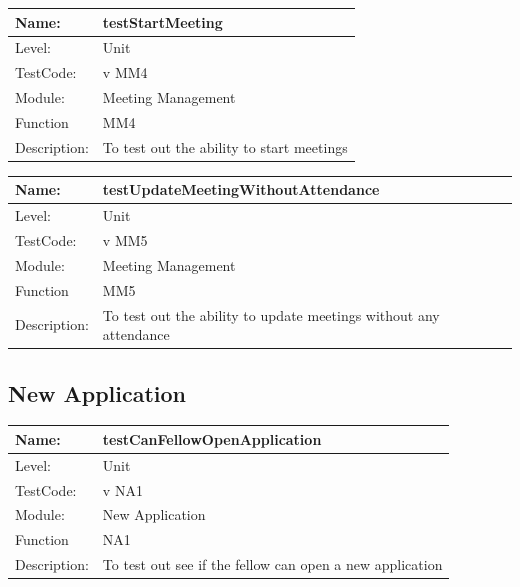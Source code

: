 \documentclass[12pt]{article}
\begin{document}
\begin{center}
\begin{tabular}{|l|p{12cm}|}
\hline

 Name: & testStartMeeting  \\
\hline
Level: & Unit \\
\hline
TestCode: & v MM4 \\
\hline
Module:& Meeting Management \\
\hline
Function & MM4 \\
\hline
Description: & To test out the ability to start meetings  \\
\hline

\end{tabular}
\end{center}

\begin{center}
\begin{tabular}{|l|p{12cm}|}
\hline

 Name: & testUpdateMeetingWithoutAttendance  \\
\hline
Level: & Unit \\
\hline
TestCode: & v MM5 \\
\hline
Module:& Meeting Management \\
\hline
Function & MM5 \\
\hline
Description: & To test out the ability to update meetings without any attendance  \\
\hline
\end{tabular}
\end{center}

\subsection{New Application}
\begin{center}
\begin{tabular}{|l|p{12cm}|}
\hline

 Name: & testCanFellowOpenApplication  \\
\hline
Level: & Unit \\
\hline
TestCode: & v NA1 \\
\hline
Module:& New Application\\
\hline
Function & NA1 \\
\hline
Description: & To test out see if the fellow can open a new application  \\
\hline

\end{tabular}
\end{center}
\end{document}
